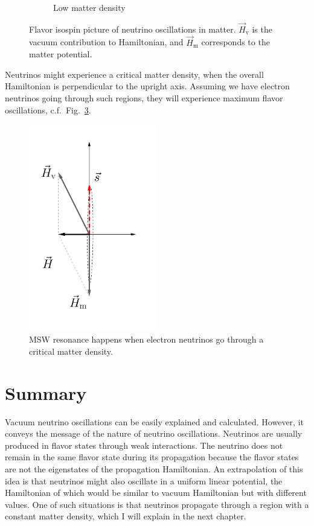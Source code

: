 \begin{figure}[htbp]
\begin{subfigure}[t]{0.3\textwidth}
		\caption{Low matter density}\label{chap:basics-sec:flavor-isospin-pic-fig:msw-adiabatic-small-density}
	\end{subfigure}
	\caption{Flavor isospin picture of neutrino oscillations in matter. $\vec H_{\mathrm v}$ is the vacuum contribution to Hamiltonian, and $\vec H_{\mathrm m}$ corresponds to the matter potential.}\label{chap:basics-sec:flavor-isospin-pic-fig:msw-adiabatic}
\end{figure}

Neutrinos might experience a critical matter density, when the overall Hamiltonian is perpendicular to the upright axis. Assuming we have electron neutrinos going through such regions, they will experience maximum flavor oscillations, c.f.~Fig.~\ref{chap:basics-sec:flavor-isospin-pic-fig:msw-adiabatic-critical}.

\begin{figure}
    \centering
    \includegraphics[width=0.5\textwidth]{chapters/assets/basics/matter-effect-critical-density}
    \caption{MSW resonance happens when electron neutrinos go through a critical matter density.}
    \label{chap:basics-sec:flavor-isospin-pic-fig:msw-adiabatic-critical}
\end{figure}






\section{Summary}

Vacuum neutrino oscillations can be easily explained and calculated. However, it conveys the message of the nature of neutrino oscillations. Neutrinos are usually produced in flavor states through weak interactions. The neutrino does not remain in the same flavor state during its propagation because the flavor states are not the eigenstates of the propagation Hamiltonian. An extrapolation of this idea is that neutrinos might also oscillate in a uniform linear potential, the Hamiltonian of which would be similar to vacuum Hamiltonian but with different values. One of such situations is that neutrinos propagate through a region with a constant matter density, which I will explain in the next chapter.
